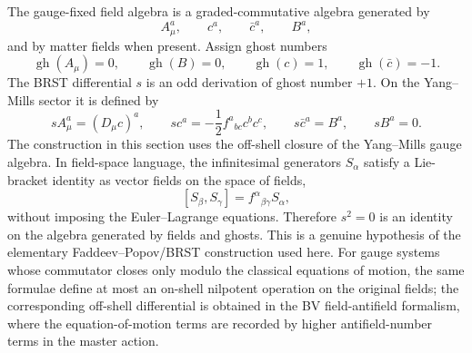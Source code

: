 The gauge-fixed field algebra is a graded-commutative algebra generated by
\[
  A_\mu^a,\qquad c^a,\qquad \bar c^a,\qquad B^a,
\]
and by matter fields when present.  Assign ghost numbers
\[
  \operatorname{gh}(A_\mu)=0,\qquad
  \operatorname{gh}(B)=0,\qquad
  \operatorname{gh}(c)=1,\qquad
  \operatorname{gh}(\bar c)=-1 .
\]
The BRST differential \(s\) is an odd derivation of ghost number \(+1\).  On
the Yang--Mills sector it is defined by
\begin{equation}
  sA_\mu^a=(D_\mu c)^a,\qquad
  sc^a=-\frac12 f^a{}_{bc}c^b c^c,\qquad
  s\bar c^a=B^a,\qquad
  sB^a=0 .
  \label{eq:brst-transformations}
\end{equation}
The construction in this section uses the off-shell closure of the
Yang--Mills gauge algebra.  In field-space language, the infinitesimal
generators \(S_\alpha\) satisfy a Lie-bracket identity as vector fields on the
space of fields,
\[
  [S_\beta,S_\gamma]=f^\alpha{}_{\beta\gamma}S_\alpha ,
\]
without imposing the Euler--Lagrange equations.  Therefore \(s^2=0\) is an
identity on the algebra generated by fields and ghosts.  This is a genuine
hypothesis of the elementary Faddeev--Popov/BRST construction used here.  For
gauge systems whose commutator closes only modulo the classical equations of
motion, the same formulae define at most an on-shell nilpotent operation on the
original fields; the corresponding off-shell differential is obtained in the
BV field-antifield formalism, where the equation-of-motion terms are recorded
by higher antifield-number terms in the master action.

